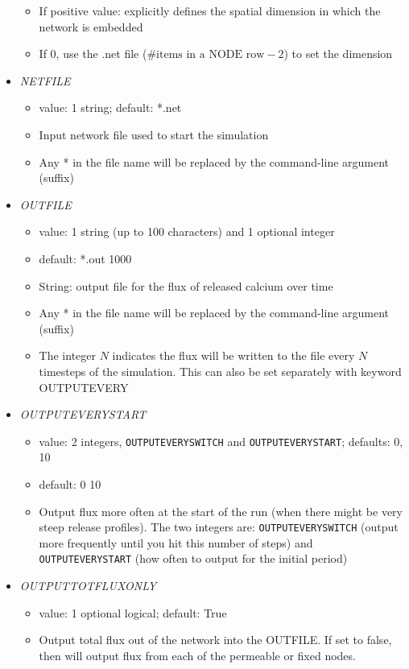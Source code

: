 \documentclass[12pt]{article}
\begin{document}
\begin{itemize}
\begin{itemize}
		\item If positive value: explicitly defines the spatial dimension in which the network is embedded
		\item If 0, use the .net file ($\text{\# items in a NODE row} - 2$) to set the dimension
	\end{itemize}
%
\item {\it NETFILE}
\begin{itemize}
	\item  value: 1 string; default: *.net
	\item Input network file used to start the simulation
	 \item Any * in the file name will be replaced by the command-line argument (suffix)
\end{itemize}
%
\item {\it OUTFILE}
    \begin{itemize}
      \item  value: 1 string (up to 100 characters) and 1 optional integer
      \item  default: *.out 1000
      \item String: output file for the flux of released calcium over time      
      \item Any * in the file name will be replaced by the command-line argument (suffix)
      \item The integer $N$ indicates the flux will be written to the file every $N$ timesteps of the simulation. This can also be set separately with keyword OUTPUTEVERY
      \end{itemize}
%
\item {\it OUTPUTEVERYSTART}
\begin{itemize}
	\item  value: 2 integers, \verb=OUTPUTEVERYSWITCH= and \verb=OUTPUTEVERYSTART=; defaults: 0, 10
	\item  default: 0 10
	\item Output flux more often at the start of the run (when there might be very steep release profiles). The two integers are: \verb=OUTPUTEVERYSWITCH= (output more frequently until you hit this number of steps) and \verb=OUTPUTEVERYSTART= (how often to output for the initial period)
\end{itemize}
%
\item {\it OUTPUTTOTFLUXONLY}
\begin{itemize}
	\item  value: 1 optional logical; default: True
	\item Output total flux out of the network into the OUTFILE. If set to false, then will output flux from each of the permeable or fixed nodes.

\end{itemize}
\end{itemize}
\end{document}
